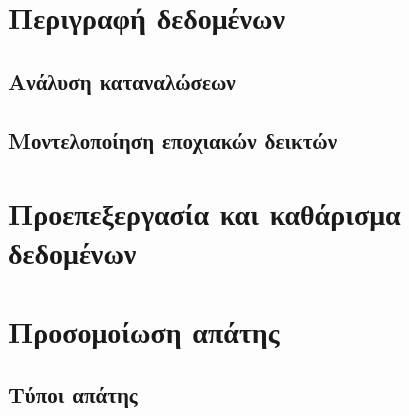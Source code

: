 \section{Περιγραφή δεδομένων}
\subsection{Ανάλυση καταναλώσεων}
\subsection{Μοντελοποίηση εποχιακών δεικτών}
\section{Προεπεξεργασία και καθάρισμα δεδομένων}
\section{Προσομοίωση απάτης}
\subsection{Τύποι απάτης}